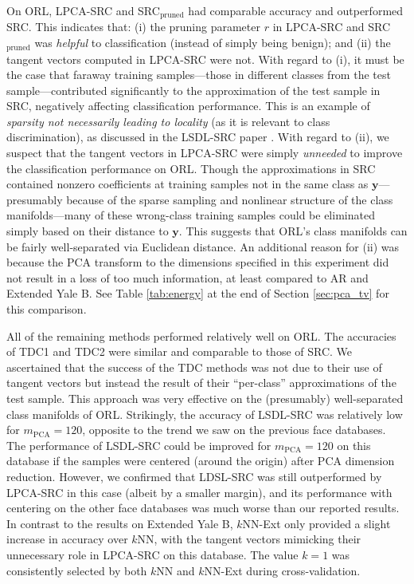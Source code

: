 \documentclass[review]{elsarticle}
\begin{document}
On ORL, LPCA-SRC and SRC$_\mathrm{pruned}$ had comparable accuracy and outperformed SRC. This indicates that: (i) the pruning parameter $r$ in LPCA-SRC and SRC$_\mathrm{pruned}$ was \emph{helpful} to classification (instead of simply being benign); and (ii) the tangent vectors computed in LPCA-SRC were not. With regard to (i), it must be the case that faraway training samples---those in different classes from the test sample---contributed significantly to the approximation of the test sample in SRC, negatively affecting classification performance. This is an example of \emph{sparsity not necessarily leading to locality} (as it is relevant to class discrimination), as discussed in the LSDL-SRC paper \cite{wei:lsdl}. With regard to (ii), we suspect that the tangent vectors in LPCA-SRC were simply \emph{unneeded} to improve the classification performance on ORL. Though the approximations in SRC contained nonzero coefficients at training samples not in the same class as $\bm{y}$---presumably because of the sparse sampling and nonlinear structure of the class manifolds---many of these wrong-class training samples could be eliminated simply based on their distance to $\bm{y}$. This suggests that ORL's class manifolds can be fairly well-separated via Euclidean distance. An additional reason for (ii) was because the PCA transform to the dimensions specified in this experiment did not result in a loss of too much information, at least compared to AR and Extended Yale B. See Table \ref{tab:energy} at the end of Section \ref{sec:pca_tv} for this comparison.


All of the remaining methods performed relatively well on ORL. The accuracies of TDC1 and TDC2 were similar and comparable to those of SRC. We ascertained that the success of the TDC methods was not due to their use of tangent vectors but instead the result of their ``per-class'' approximations of the test sample. This approach was very effective on the (presumably) well-separated class manifolds of ORL. Strikingly, the accuracy of LSDL-SRC was relatively low for $m_\mathrm{PCA} = 120$, opposite to the trend we saw on the previous face databases. The performance of LSDL-SRC could be improved for $m_\mathrm{PCA}=120$ on this database if the samples were centered (around the origin) after PCA dimension reduction. However, we confirmed that LDSL-SRC was still outperformed by LPCA-SRC in this case (albeit by a smaller margin), and its performance with centering on the other face databases was much worse than our reported results. In contrast to the results on Extended Yale B, $k$NN-Ext only provided a slight increase in accuracy over $k$NN, with the tangent vectors mimicking their unnecessary role in LPCA-SRC on this database. The value $k=1$ was consistently selected by both $k$NN and $k$NN-Ext during cross-validation. 
\end{document}

